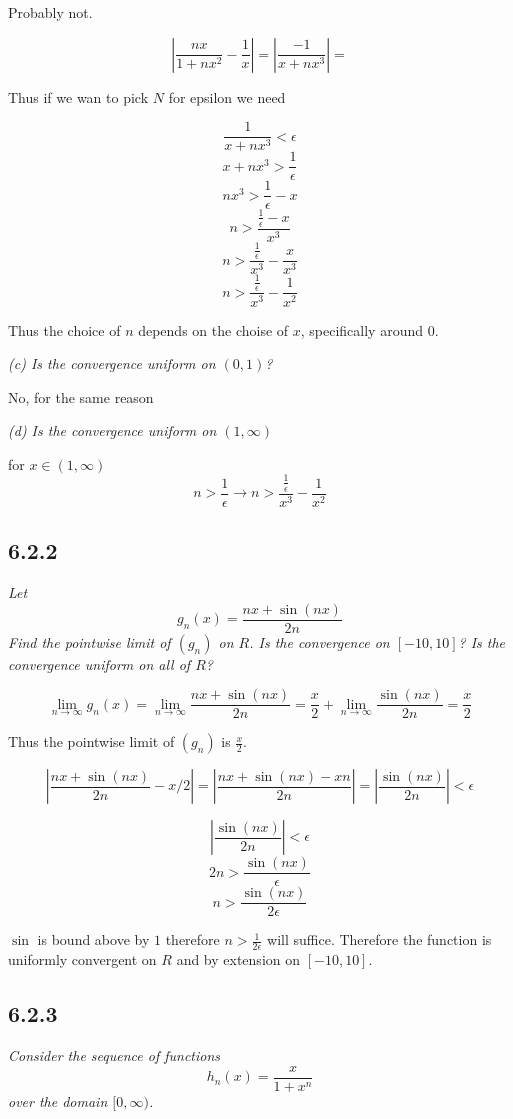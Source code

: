 \documentclass[11pt,oneside,titlepage]{book}
\begin{document}
Probably not.

$$\left|\frac{nx}{1 + nx^2} - \frac{1}{x}\right| =
\left|\frac{-1}{x + nx^3} \right| =
$$

Thus if we wan to pick $N$ for epsilon we need

$$\frac{1}{x + nx^3} < \epsilon$$
$$x + nx^3 > \frac{1}{\epsilon}$$
$$nx^3 > \frac{1}{\epsilon} - x$$
$$n > \frac{\frac{1}{\epsilon} - x}{x^3}$$
$$n > \frac{\frac{1}{\epsilon}}{x^3} - \frac{x}{x^3}$$
$$n > \frac{\frac{1}{\epsilon}}{x^3} - \frac{1}{x^2}$$

Thus the choice of $n$ depends on the choise of $x$, specifically around
0.

\textit{(c) Is the convergence uniform on $(0, 1)$?}

No, for the same reason

\textit{(d) Is the convergence uniform on $(1, \infty)$}

for $x \in (1, \infty)$
$$n > \frac{1}{\epsilon} \to n > \frac{\frac{1}{\epsilon}}{x^3} - \frac{1}{x^2}$$


\subsection*{6.2.2}
\textit{Let}
$$g_n(x) = \frac{nx + \sin{(nx)}}{2n}$$
\textit{Find the pointwise limit of $(g_n)$ on $R$. Is the convergence on
  $[-10, 10]$? Is the convergence uniform on all of $R$?}

$$\lim_{n \to \infty}{g_n(x)} = \lim_{n \to \infty}\frac{nx + \sin{(nx)}}{2n}
= \frac{x}{2} + \lim_{n \to \infty}\frac{\sin{(nx)}}{2n} = \frac{x}{2}$$

Thus the pointwise limit of $(g_n)$ is $\frac{x}{2}$.

$$|\frac{nx + \sin{(nx)}}{2n} - x/2| =
|\frac{nx + \sin{(nx)} - xn}{2n} | =
|\frac{\sin{(nx)}}{2n} | < \epsilon$$

$$|\frac{\sin{(nx)}}{2n} | < \epsilon$$
$$2n  > \frac{\sin{(nx)}}{\epsilon}$$
$$n  > \frac{\sin{(nx)}}{2\epsilon}$$

$\sin$ is bound above by $1$ therefore $n > \frac{1}{2\epsilon}$ will suffice.
Therefore the function is uniformly convergent on $R$ and by
extension on $[-10, 10]$.

\subsection*{6.2.3}
\textit{Consider the sequence of functions}
$$h_n(x) = \frac{x}{1 + x^n}$$
\textit{over the domain $[0, \infty)$.}
\end{document}
